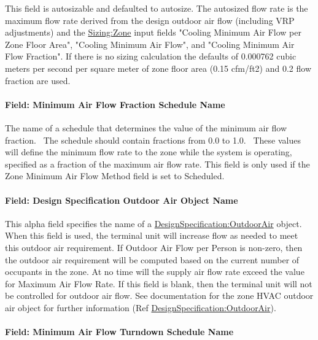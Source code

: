 This field is autosizable and defaulted to autosize. The autosized flow rate is the maximum flow rate derived from the design outdoor air flow (including VRP adjustments) and the \hyperref[sizingzone]{Sizing:Zone} input fields "Cooling Minimum Air Flow per Zone Floor Area", "Cooling Minimum Air Flow", and "Cooling Minimum Air Flow Fraction". If there is no sizing calculation the defaults of 0.000762 cubic meters per second per square meter of zone floor area (0.15 cfm/ft2) and 0.2 flow fraction are used.

\paragraph{Field: Minimum Air Flow Fraction Schedule Name}\label{field-minimum-air-flow-fraction-schedule-name-1}

The name of a schedule that determines the value of the minimum air flow fraction.~ The schedule should contain fractions from 0.0 to 1.0.~ These values will define the minimum flow rate to the zone while the system is operating, specified as a fraction of the maximum air flow rate. This field is only used if the Zone Minimum Air Flow Method field is set to Scheduled.

\paragraph{Field: Design Specification Outdoor Air Object Name}\label{field-design-specification-outdoor-air-object-name-1}

This alpha field specifies the name of a \hyperref[designspecificationoutdoorair]{DesignSpecification:OutdoorAir} object. When this field is used, the terminal unit will increase flow as needed to meet this outdoor air requirement. If Outdoor Air Flow per Person is non-zero, then the outdoor air requirement will be computed based on the current number of occupants in the zone. At no time will the supply air flow rate exceed the value for Maximum Air Flow Rate. If this field is blank, then the terminal unit will not be controlled for outdoor air flow. See documentation for the zone HVAC outdoor air object for further information (Ref \hyperref[designspecificationoutdoorair]{DesignSpecification:OutdoorAir}).

\paragraph{Field: Minimum Air Flow Turndown Schedule Name}

